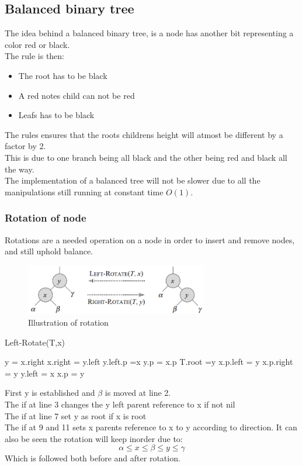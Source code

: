 \documentclass[12pt, a4paper]{article}
\begin{document}
					
			\subsection{Balanced binary tree}
				The idea behind a balanced binary tree, is a node has another bit representing a color red or black.\\
				The rule is then:
				\begin{itemize}
					\item The root has to be black
					\item A red notes child can not be red
					\item Leafs has to be black
				\end{itemize}
				The rules ensures that the roots childrens height will atmost be different by a factor by 2.\\
				This is due to one branch being all black and the other being red and black all the way.\\
				The implementation of a balanced tree will not be slower due to all the manipulations still running at constant time $O(1)$.
				\subsubsection{Rotation of node}
					Rotations are a needed operation on a node in order to insert and remove nodes, and still uphold balance.\\
					\begin{figure}[h!]
						\center
						\includegraphics[width=300px]{assets/rotation.png}
						\caption{Illustration of rotation}
					\end{figure}
					
					\begin{minipage}{0.49\textwidth}
						Left-Rotate(T,x)
						\begin{algorithmic}[1]
							\State y = x.right
							\State x.right = y.left
								\State y.left.p =x
							\EndIf
							\State y.p = x.p
								\State T.root =y
								\State x.p.left = y
							\Else 
								\State x.p.right = y
							\EndIf
							\State y.left = x
							\State x.p = y
						\end{algorithmic}
					\end{minipage}
					\begin{minipage}{0.49\textwidth}
						First y is established and $\beta$ is moved at line 2.\\
						The if at line 3 changes the y left parent reference to x if not nil\\
						The if at line 7 set y as root if x is root\\
						The if at 9 and 11 sets x parents reference to x to y according to direction.
						It can also be seen the rotation will keep inorder due to:
						$$\alpha \leq x \leq \beta \leq  y \leq \gamma$$
						Which is followed both before and after rotation.
					\end{minipage}
\end{document}
